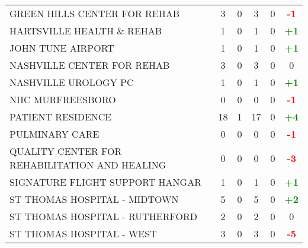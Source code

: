 \documentclass{article}
\begin{document}
\begin{longtable}{l|cccc|c}
    
        GREEN HILLS CENTER FOR REHAB & 3 & 0 & 3 & 0 & \textcolor{red}{\textbf{-1}} \\
    

    
        HARTSVILLE HEALTH \& REHAB & 1 & 0 & 1 & 0 & \textcolor{green}{\textbf{+1}} \\
    

    
        JOHN TUNE AIRPORT & 1 & 0 & 1 & 0 & \textcolor{green}{\textbf{+1}} \\
    

    
        NASHVILLE CENTER FOR REHAB & 3 & 0 & 3 & 0 & 0 \\
    

    
        NASHVILLE UROLOGY PC & 1 & 0 & 1 & 0 & \textcolor{green}{\textbf{+1}} \\
    

    
        NHC MURFREESBORO & 0 & 0 & 0 & 0 & \textcolor{red}{\textbf{-1}} \\
    

    
        PATIENT RESIDENCE & 18 & 1 & 17 & 0 & \textcolor{green}{\textbf{+4}} \\
    

    
        PULMINARY CARE & 0 & 0 & 0 & 0 & \textcolor{red}{\textbf{-1}} \\
    

    
        QUALITY CENTER FOR REHABILITATION AND HEALING & 0 & 0 & 0 & 0 & \textcolor{red}{\textbf{-3}} \\
    

    
        SIGNATURE FLIGHT SUPPORT HANGAR & 1 & 0 & 1 & 0 & \textcolor{green}{\textbf{+1}} \\
    

    
        ST THOMAS HOSPITAL - MIDTOWN & 5 & 0 & 5 & 0 & \textcolor{green}{\textbf{+2}} \\
    

    
        ST THOMAS HOSPITAL - RUTHERFORD & 2 & 0 & 2 & 0 & 0 \\
    

    
        ST THOMAS HOSPITAL - WEST & 3 & 0 & 3 & 0 & \textcolor{red}{\textbf{-5}} \\
    


\end{longtable}
\end{document}
